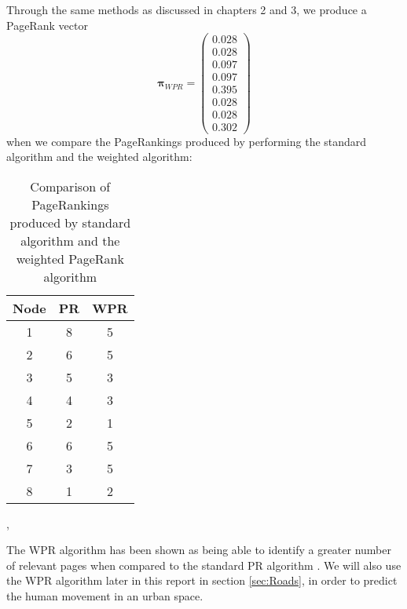 Through the same methods as discussed in chapters 2 and 3, we produce a PageRank vector 
\[\boldsymbol\pi_{WPR} = \left(
\begin{array}{c}
0.028 \\
0.028 \\
0.097 \\
0.097 \\
0.395 \\
0.028 \\
0.028 \\
0.302
\end{array}
\right)\]
when we compare the PageRankings produced by performing the standard algorithm and the weighted algorithm:
\begin{table}[H] \caption{Comparison of PageRankings produced by standard algorithm and the weighted PageRank algorithm}
 \centering
 \begin{tabular} {c| c c} 
 Node & PR & WPR \\ [0.5ex] 
 \hline
 1&8&5\\
 2&6&5\\
 3&5&3\\
 4&4&3\\
 5&2&1\\
 6&6&5\\
 7&3&5\\
 8&1&2\\
 \end{tabular}
 \label{Table:WPR and PR}
\end{table}
\cite{langville}, \cite{baeza2004web}

The WPR algorithm has been shown as being able to identify a greater number of relevant pages when compared to the standard PR algorithm \cite{xing2004weighted}. We will also use the WPR algorithm later in this report in section \ref{sec:Roads}, in order to predict the human movement in an urban space. 